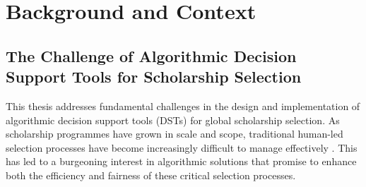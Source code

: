 \chapter{\label{ch:context}Background and Context}




\minitoc

\section{The Challenge of Algorithmic Decision Support Tools for Scholarship Selection}\label{sec:context_algorithmic_diversity}
This thesis addresses fundamental challenges in the design and implementation of algorithmic decision support tools (DSTs) for global scholarship selection. As scholarship programmes have grown in scale and scope, traditional human-led selection processes have become increasingly difficult to manage effectively \cite{Latzer_Hollnbuchner_Just_Saurwein_2014}. This has led to a burgeoning interest in algorithmic solutions that promise to enhance both the efficiency and fairness of these critical selection processes.

